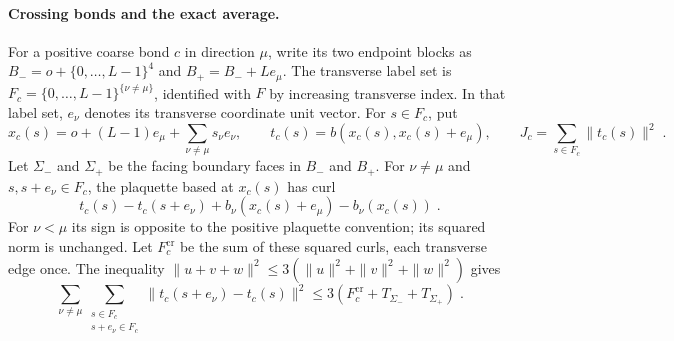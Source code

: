 \documentclass[11pt]{article}
\begin{document}
\paragraph{Crossing bonds and the exact average.}
For a positive coarse bond $c$ in direction $\mu$, write its two endpoint blocks as $B_-=o+\{0,\ldots,L-1\}^4$ and $B_+=B_-+Le_\mu$. The transverse label set is $F_c=\{0,\ldots,L-1\}^{\{\nu\ne \mu\}}$, identified with $F$ by increasing transverse index. In that label set, $e_\nu$ denotes its transverse coordinate unit vector. For $s\in F_c$, put
\begin{equation}\label{eq:direct-interface-data}
    x_c(s)=o+(L-1)e_\mu+\sum_{\nu\ne \mu}s_\nu e_\nu,
    \qquad
    t_c(s)=b(x_c(s),x_c(s)+e_\mu),
    \qquad
    J_c=\sum_{s\in F_c}\|t_c(s)\|^2\;.
\end{equation}
Let $\Sigma_-$ and $\Sigma_+$ be the facing boundary faces in $B_-$ and $B_+$. For $\nu\ne \mu$ and $s,s+e_\nu\in F_c$, the plaquette based at $x_c(s)$ has curl
\begin{equation}\label{eq:direct-interface-curl}
    t_c(s)-t_c(s+e_\nu)
        +b_\nu(x_c(s)+e_\mu)-b_\nu(x_c(s))\;.
\end{equation}
For $\nu<\mu$ its sign is opposite to the positive plaquette convention; its squared norm is unchanged. Let $F_c^{\mathrm{cr}}$ be the sum of these squared curls, each transverse edge once. The inequality $\|u+v+w\|^2\leq 3(\|u\|^2+\|v\|^2+\|w\|^2)$ gives
\begin{equation}\label{eq:direct-interface-gradient}
    \sum_{\nu\ne \mu}
        \sum_{\substack{s\in F_c\\s+e_\nu\in F_c}}
            \|t_c(s+e_\nu)-t_c(s)\|^2
        \leq 3(F_c^{\mathrm{cr}}+T_{\Sigma_-}+T_{\Sigma_+})\;.
\end{equation}
\end{document}
